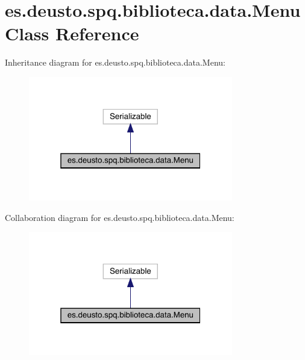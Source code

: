 \hypertarget{classes_1_1deusto_1_1spq_1_1biblioteca_1_1data_1_1_menu}{}\section{es.\+deusto.\+spq.\+biblioteca.\+data.\+Menu Class Reference}
\label{classes_1_1deusto_1_1spq_1_1biblioteca_1_1data_1_1_menu}


Inheritance diagram for es.\+deusto.\+spq.\+biblioteca.\+data.\+Menu\+:
\nopagebreak
\begin{figure}[H]
\begin{center}
\leavevmode
\includegraphics[width=253pt]{classes_1_1deusto_1_1spq_1_1biblioteca_1_1data_1_1_menu__inherit__graph}
\end{center}
\end{figure}


Collaboration diagram for es.\+deusto.\+spq.\+biblioteca.\+data.\+Menu\+:
\nopagebreak
\begin{figure}[H]
\begin{center}
\leavevmode
\includegraphics[width=253pt]{classes_1_1deusto_1_1spq_1_1biblioteca_1_1data_1_1_menu__coll__graph}
\end{center}
\end{figure}
